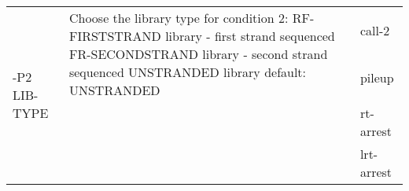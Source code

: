 {\small
\begin{tabular}{@{}p{}p{}l@{}}
\multirow{4}{=}{-P2 LIB-TYPE} & \multirow{2}{=}{Choose the library type for condition 2:
RF-FIRSTSTRAND	library - first strand sequenced
FR-SECONDSTRAND	library - second strand sequenced
UNSTRANDED	library
default: UNSTRANDED} & call-2 \\
 & & pileup \\
 & & rt-arrest \\
 & & lrt-arrest \\
\end{tabular}\\
}
